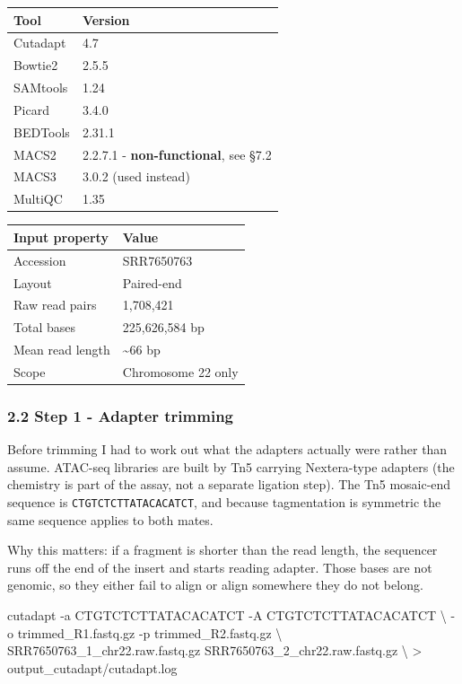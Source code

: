 \documentclass[
  11pt,
  a4paper,
]{article}
\newenvironment{Shaded}{}{}
\newcommand{\AttributeTok}[1]{\textcolor[rgb]{0.49,0.56,0.16}{#1}}
\newcommand{\DataTypeTok}[1]{\textcolor[rgb]{0.56,0.13,0.00}{#1}}
\newcommand{\ExtensionTok}[1]{#1}
\newcommand{\NormalTok}[1]{#1}
\newcommand{\OperatorTok}[1]{\textcolor[rgb]{0.40,0.40,0.40}{#1}}
\begin{document}
\begin{longtable}[]{@{}ll@{}}
\toprule\noalign{}
Tool & Version \\
\midrule\noalign{}
\endhead
\bottomrule\noalign{}
\endlastfoot
Cutadapt & 4.7 \\
Bowtie2 & 2.5.5 \\
SAMtools & 1.24 \\
Picard & 3.4.0 \\
BEDTools & 2.31.1 \\
MACS2 & 2.2.7.1 - \textbf{non-functional}, see §7.2 \\
MACS3 & 3.0.2 (used instead) \\
MultiQC & 1.35 \\
\end{longtable}

\begin{longtable}[]{@{}ll@{}}
\toprule\noalign{}
Input property & Value \\
\midrule\noalign{}
\endhead
\bottomrule\noalign{}
\endlastfoot
Accession & SRR7650763 \\
Layout & Paired-end \\
Raw read pairs & 1,708,421 \\
Total bases & 225,626,584 bp \\
Mean read length & \textasciitilde66 bp \\
Scope & Chromosome 22 only \\
\end{longtable}

\hypertarget{step-1---adapter-trimming}{%
\subsubsection{2.2 Step 1 - Adapter
trimming}\label{step-1---adapter-trimming}}

Before trimming I had to work out what the adapters actually were rather
than assume. ATAC-seq libraries are built by Tn5 carrying Nextera-type
adapters (the chemistry is part of the assay, not a separate ligation
step). The Tn5 mosaic-end sequence is \texttt{CTGTCTCTTATACACATCT}, and
because tagmentation is symmetric the same sequence applies to both
mates.

Why this matters: if a fragment is shorter than the read length, the
sequencer runs off the end of the insert and starts reading adapter.
Those bases are not genomic, so they either fail to align or align
somewhere they do not belong.

\begin{Shaded}
\begin{Highlighting}[]
\ExtensionTok{cutadapt} \AttributeTok{{-}a}\NormalTok{ CTGTCTCTTATACACATCT }\AttributeTok{{-}A}\NormalTok{ CTGTCTCTTATACACATCT }\DataTypeTok{\textbackslash{}}
  \AttributeTok{{-}o}\NormalTok{ trimmed\_R1.fastq.gz }\AttributeTok{{-}p}\NormalTok{ trimmed\_R2.fastq.gz }\DataTypeTok{\textbackslash{}}
\NormalTok{  SRR7650763\_1\_chr22.raw.fastq.gz SRR7650763\_2\_chr22.raw.fastq.gz }\DataTypeTok{\textbackslash{}}
  \OperatorTok{\textgreater{}}\NormalTok{ output\_cutadapt/cutadapt.log}
\end{Highlighting}
\end{Shaded}
\end{document}
